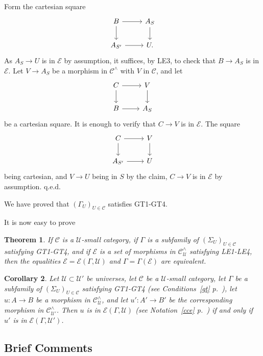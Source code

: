 \documentclass[12pt]{article}%
\newtheorem{thm}{Theorem}%
\newtheorem{cor}[thm]{Corollary}
\theoremstyle{remark}
\theoremstyle{definition}
\newcommand{\cc}{\mathcal}
\newcommand{\C}{\mathcal C}
\newcommand{\U}{\mathcal U}
\begin{document}
Form the cartesian square 
$$
\begin{tikzcd}
B\ar{r}\ar{d}&A_S\ar{d}\\ 
A_{S'}\ar{r}&U.
\end{tikzcd}
$$ 
As $A_S\to U$ is in $\cc E$ by assumption, it suffices, by LE3, to check that $B\to A_S$ is in $\cc E$. Let $V\to A_S$ be a morphism in $\C^\wedge$ with $V$ in $\C$, and let 
$$
\begin{tikzcd}
C\ar{r}\ar{d}&V\ar{d}\\ 
B\ar{r}&A_S
\end{tikzcd}
$$ 
be a cartesian square. It is enough to verify that $C\to V$ is in $\cc E$. The square 
$$
\begin{tikzcd}
C\ar{r}\ar{d}&V\ar{d}\\ 
A_{S'}\ar{r}&U
\end{tikzcd}
$$ 
being cartesian, and $V\to U$ being in $S$ by the claim, $C\to V$ is in $\cc E$ by assumption. q.e.d.

We have proved that $(\Gamma_U)_{U\in\C}$ satisfies GT1-GT4. 

It is now easy to prove 

\begin{thm}
If $\C$ is a $\U$-small category, if $\Gamma$ is a subfamily of $(\Sigma_U)_{U\in\C}$ satisfying GT1-GT4, and if $\cc E$ is a set of morphisms in $\C^\wedge_\U$ satisfying LE1-LE4, then the equalities $\cc E=\cc E(\Gamma,\U)$ and $\Gamma=\Gamma(\cc E)$ are equivalent.
\end{thm}

\begin{cor}\label{leu}
Let $\U\subset\U'$ be universes, let $\C$ be a $\U$-small category, let $\Gamma$ be a subfamily of $(\Sigma_U)_{U\in\C}$ satisfying GT1-GT4 (see Conditions~\ref{gt} p.~\pageref{gt}), let $u:A\to B$ be a morphism in $\C^\wedge_\U$, and let $u':A'\to B'$ be the corresponding morphism in $\C^\wedge_{\U'}$. Then $u$ is in $\cc E(\Gamma,\U)$ (see Notation~\ref{cce} p.~\pageref{cce}) if and only if $u'$ is in $\cc E(\Gamma,\U')$.
\end{cor}


\subsection{Brief Comments}
\end{document}

